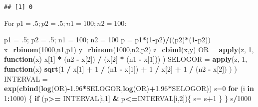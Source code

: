 \documentclass[]{article}
\newenvironment{Shaded}{\begin{snugshade}}{\end{snugshade}}
\newcommand{\KeywordTok}[1]{\textcolor[rgb]{0.13,0.29,0.53}{\textbf{#1}}}
\newcommand{\DecValTok}[1]{\textcolor[rgb]{0.00,0.00,0.81}{#1}}
\newcommand{\FloatTok}[1]{\textcolor[rgb]{0.00,0.00,0.81}{#1}}
\newcommand{\StringTok}[1]{\textcolor[rgb]{0.31,0.60,0.02}{#1}}
\newcommand{\ControlFlowTok}[1]{\textcolor[rgb]{0.13,0.29,0.53}{\textbf{#1}}}
\newcommand{\OperatorTok}[1]{\textcolor[rgb]{0.81,0.36,0.00}{\textbf{#1}}}
\newcommand{\NormalTok}[1]{#1}
\begin{document}
\begin{verbatim}
## [1] 0
\end{verbatim}

For \(p1 = .5; p2 = .5; n1 = 100; n2 = 100\):

\begin{Shaded}
\begin{Highlighting}[]
\NormalTok{p1 =}\StringTok{ }\NormalTok{.}\DecValTok{5}\NormalTok{; p2 =}\StringTok{ }\NormalTok{.}\DecValTok{5}\NormalTok{; n1 =}\StringTok{ }\DecValTok{100}\NormalTok{; n2 =}\StringTok{ }\DecValTok{100}
\NormalTok{p =}\StringTok{ }\NormalTok{p1}\OperatorTok{*}\NormalTok{(}\DecValTok{1}\OperatorTok{-}\NormalTok{p2)}\OperatorTok{/}\NormalTok{((p2)}\OperatorTok{*}\NormalTok{(}\DecValTok{1}\OperatorTok{-}\NormalTok{p2))}
\NormalTok{x=}\KeywordTok{rbinom}\NormalTok{(}\DecValTok{1000}\NormalTok{,n1,p1)}
\NormalTok{y=}\KeywordTok{rbinom}\NormalTok{(}\DecValTok{1000}\NormalTok{,n2,p2)}
\NormalTok{z=}\KeywordTok{cbind}\NormalTok{(x,y)}
\NormalTok{OR =}\StringTok{ }\KeywordTok{apply}\NormalTok{(z, }\DecValTok{1}\NormalTok{, }\ControlFlowTok{function}\NormalTok{(x) x[}\DecValTok{1}\NormalTok{] }\OperatorTok{*}\StringTok{ }\NormalTok{(n2 }\OperatorTok{-}\StringTok{ }\NormalTok{x[}\DecValTok{2}\NormalTok{]) }\OperatorTok{/}\StringTok{ }\NormalTok{(x[}\DecValTok{2}\NormalTok{] }\OperatorTok{*}\StringTok{ }\NormalTok{(n1 }\OperatorTok{-}\StringTok{ }\NormalTok{x[}\DecValTok{1}\NormalTok{])) )}
\NormalTok{SELOGOR =}\StringTok{ }\KeywordTok{apply}\NormalTok{(z, }\DecValTok{1}\NormalTok{, }\ControlFlowTok{function}\NormalTok{(x) }\KeywordTok{sqrt}\NormalTok{(}\DecValTok{1} \OperatorTok{/}\StringTok{ }\NormalTok{x[}\DecValTok{1}\NormalTok{] }\OperatorTok{+}\StringTok{ }\DecValTok{1} \OperatorTok{/}\StringTok{ }\NormalTok{(n1 }\OperatorTok{-}\StringTok{ }\NormalTok{x[}\DecValTok{1}\NormalTok{]) }\OperatorTok{+}\StringTok{ }\DecValTok{1} \OperatorTok{/}\StringTok{ }\NormalTok{x[}\DecValTok{2}\NormalTok{] }\OperatorTok{+}\StringTok{ }\DecValTok{1} \OperatorTok{/}\StringTok{ }\NormalTok{(n2 }\OperatorTok{-}\StringTok{ }\NormalTok{x[}\DecValTok{2}\NormalTok{]) ) )}
\NormalTok{INTERVAL =}\StringTok{ }\KeywordTok{exp}\NormalTok{(}\KeywordTok{cbind}\NormalTok{(}\KeywordTok{log}\NormalTok{(OR)}\OperatorTok{-}\FloatTok{1.96}\OperatorTok{*}\NormalTok{SELOGOR,}\KeywordTok{log}\NormalTok{(OR)}\OperatorTok{+}\FloatTok{1.96}\OperatorTok{*}\NormalTok{SELOGOR))}
\NormalTok{s=}\DecValTok{0}
\ControlFlowTok{for}\NormalTok{ (i }\ControlFlowTok{in} \DecValTok{1}\OperatorTok{:}\DecValTok{1000}\NormalTok{) \{}
  \ControlFlowTok{if}\NormalTok{ (p}\OperatorTok{>=}\StringTok{ }\NormalTok{INTERVAL[i,}\DecValTok{1}\NormalTok{] }\OperatorTok{&}\StringTok{ }\NormalTok{p}\OperatorTok{<=}\NormalTok{INTERVAL[i,}\DecValTok{2}\NormalTok{])\{}
\NormalTok{    s=}\StringTok{ }\NormalTok{s}\OperatorTok{+}\DecValTok{1}
\NormalTok{  \}}
\NormalTok{\}}
\NormalTok{s}\OperatorTok{/}\DecValTok{1000}
\end{Highlighting}
\end{Shaded}
\end{document}
